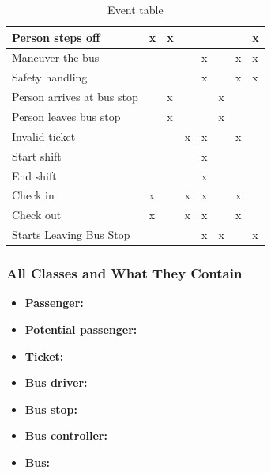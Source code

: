\begin{table}[H]
{\begin{tabular}{|l|l|l|l|l|l|l|l|}
Person steps off           & x         & x                   &        &            &          &                & x   \\ \hline
Maneuver the bus           &           &                     &        & x          &          & x              & x   \\ \hline
Safety handling            &           &                     &        & x          &          & x              & x   \\ \hline
Person arrives at bus stop &           & x                   &        &            & x        &                &     \\ \hline
Person leaves bus stop     &           & x                   &        &            & x        &                &     \\ \hline
Invalid ticket             &           &                     & x      & x          &          & x              &     \\ \hline
Start shift                &           &                     &        & x          &          &                &     \\ \hline
End shift                  &           &                     &        & x          &          &                &     \\ \hline
Check in                   & x         &                     & x      & x          &          & x              &     \\ \hline
Check out                  & x         &                     & x      & x          &          & x              &     \\ \hline
Starts Leaving Bus Stop            &           &                     &        & x          & x        &                & x   \\ \hline
\end{tabular}%
}
\caption{Event table}
\end{table}

\subsubsection{All Classes and What They Contain}
\begin{itemize}
\item \textbf{Passenger:}

\item \textbf{Potential passenger:}

\item \textbf{Ticket:}

\item \textbf{Bus driver:}

\item \textbf{Bus stop:}

\item \textbf{Bus controller:}

\item \textbf{Bus:}

\end{itemize}


